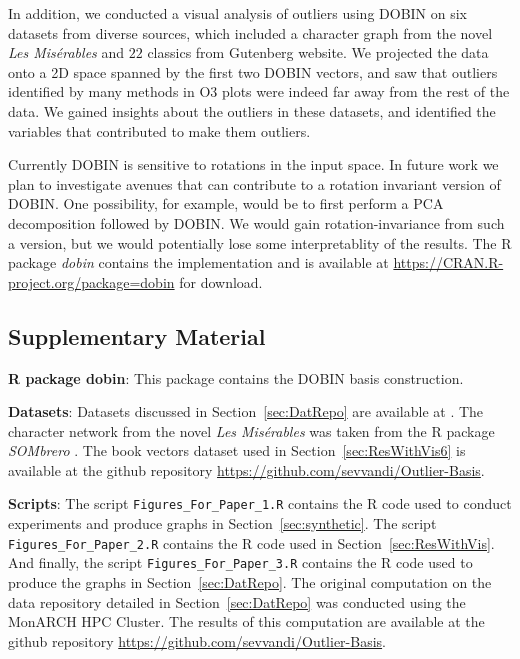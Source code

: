\documentclass[letter,12pt]{article}
\begin{document}
In addition, we conducted a visual analysis of outliers using DOBIN on six datasets from diverse sources, which included a character graph from the novel \textit{Les Mis\'erables} and $22$ classics from Gutenberg website. We projected the data onto a 2D space spanned by the first two DOBIN vectors, and saw that outliers identified by many methods in O3 plots were indeed far away from the rest of the data. We gained insights about the outliers in these datasets, and identified the variables that contributed to make them outliers.


Currently DOBIN is sensitive to rotations in the input space. In future work we plan to investigate avenues that can contribute to a rotation invariant version of DOBIN. One possibility, for example, would be to first perform a PCA decomposition followed by DOBIN. We would gain rotation-invariance from such a version, but we would potentially lose some interpretablity of the results. The R package \textit{dobin} contains the implementation and is available at \url{https://CRAN.R-project.org/package=dobin} for download.

\clearpage

\subsection*{Supplementary Material}

\textbf{R package dobin}: This package contains the DOBIN basis construction.

\textbf{Datasets}: Datasets discussed in Section~\ref{sec:DatRepo} are available at \cite{datasets}. The character network from the novel \textit{Les Mis\'erables} was taken from the R package \textit{SOMbrero} \citep{sombrero}. The book vectors dataset used in Section~\ref{sec:ResWithVis6} is available at the github repository \url{https://github.com/sevvandi/Outlier-Basis}.

\textbf{Scripts}: The script \texttt{Figures\_For\_Paper\_1.R} contains the R code used to conduct experiments and produce graphs in Section~\ref{sec:synthetic}. The script \texttt{Figures\_For\_Paper\_2.R} contains the R code used in Section~\ref{sec:ResWithVis}. And finally, the script \texttt{Figures\_For\_Paper\_3.R} contains the R code used to produce the graphs in Section~\ref{sec:DatRepo}. The original computation on the data repository detailed in Section~\ref{sec:DatRepo} was conducted using the MonARCH HPC Cluster. The results of this computation are available at the github repository \url{https://github.com/sevvandi/Outlier-Basis}.
\end{document}
